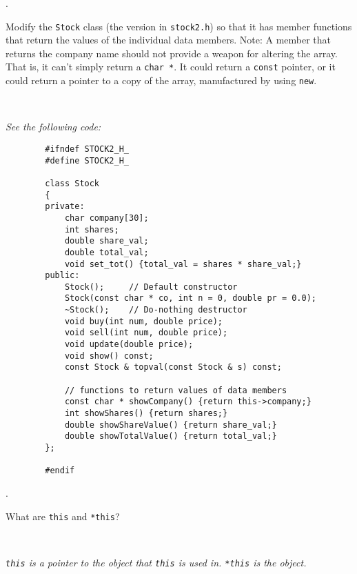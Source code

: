 \documentclass{amsart}
\begin{document}
. 
\begin{minipage}[t]{11.5 cm}
	Modify the \texttt{Stock} class (the version in \verb+stock2.h+) so that it has member functions that return the values of the individual data members. Note: A member that returns the company name should not provide a weapon for altering the array. That is, it can't simply return a \verb+char *+. It could return a \texttt{const} pointer, or it could return a pointer to a copy of the array, manufactured by using \texttt{new}.
\end{minipage} \\[1ex]
\phantom{2. } 
\begin{minipage}[t]{11.5 cm}
	{\slshape 
	See the following code:
	}
	\begin{verbatim}
		#ifndef STOCK2_H_
		#define STOCK2_H_
		
		class Stock
		{
		private:
		    char company[30];
		    int shares;
		    double share_val;
		    double total_val;
		    void set_tot() {total_val = shares * share_val;}
		public:
		    Stock();     // Default constructor
		    Stock(const char * co, int n = 0, double pr = 0.0);
		    ~Stock();    // Do-nothing destructor
		    void buy(int num, double price);
		    void sell(int num, double price);
		    void update(double price);
		    void show() const;
		    const Stock & topval(const Stock & s) const;

		    // functions to return values of data members
		    const char * showCompany() {return this->company;}
		    int showShares() {return shares;}
		    double showShareValue() {return share_val;}
		    double showTotalValue() {return total_val;}
		};

		#endif
	\end{verbatim}
\end{minipage} 
\vfill

. 
\begin{minipage}[t]{11.5 cm}
	What are \texttt{this} and \texttt{*this}?
\end{minipage} \\[1ex]
\phantom{3. } 
\begin{minipage}[t]{11.5 cm}
	{\slshape 
	\verb+this+ is a pointer to the object that \verb+this+
	is used in.
	\verb+*this+ is the object. 
	} 
\end{minipage} 
\vfill
	
\end{document}
